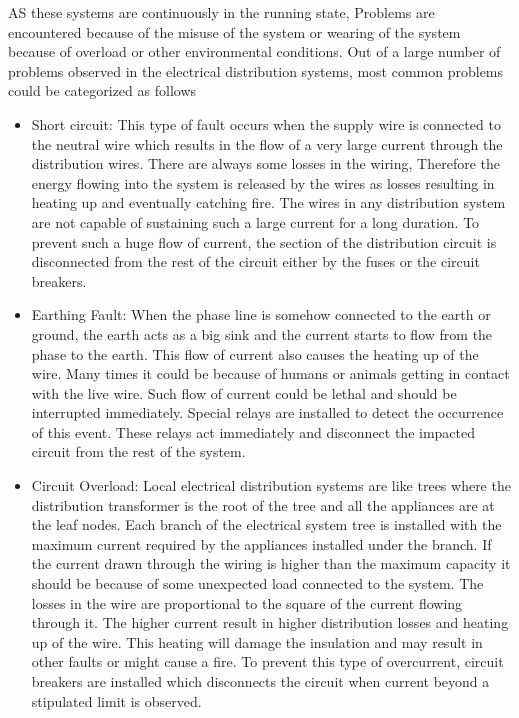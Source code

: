 AS these systems are continuously in the running state, Problems are encountered because of the misuse of the system or wearing of the system because of overload or other environmental conditions. Out of a large number of problems observed in the electrical distribution systems, most common problems could be categorized as follows

\begin{itemize}
\item Short circuit: This type of fault occurs when the supply wire is connected to the neutral wire which results in the flow of a very large current through the distribution wires. There are always some losses in the wiring, Therefore the energy flowing into the system is released by the wires as losses resulting in heating up and eventually catching fire. The wires in any distribution system are not capable of sustaining such a large current for a long duration. To prevent such a huge flow of current, the section of the distribution circuit is disconnected from the rest of the circuit either by the fuses or the circuit breakers.

\item Earthing Fault: When the phase line is somehow connected to the earth or ground, the earth acts as a big sink and the current starts to flow from the phase to the earth. This flow of current also causes the heating up of the wire. Many times it could be because of humans or animals getting in contact with the live wire. Such flow of current could be lethal and should be interrupted immediately. Special relays are installed to detect the occurrence of this event. These relays act immediately and disconnect the impacted circuit from the rest of the system.

\item Circuit Overload: Local electrical distribution systems are like trees where the distribution transformer is the root of the tree and all the appliances are at the leaf nodes. Each branch of the electrical system tree is installed with the maximum current required by the appliances installed under the branch. If the current drawn through the wiring is higher than the maximum capacity it should be because of some unexpected load connected to the system. The losses in the wire are proportional to the square of the current flowing through it. The higher current result in higher distribution losses and heating up of the wire. This heating will damage the insulation and may result in other faults or might cause a fire. To prevent this type of overcurrent, circuit breakers are installed which disconnects the circuit when current beyond a stipulated limit is observed. 


\end{itemize}
